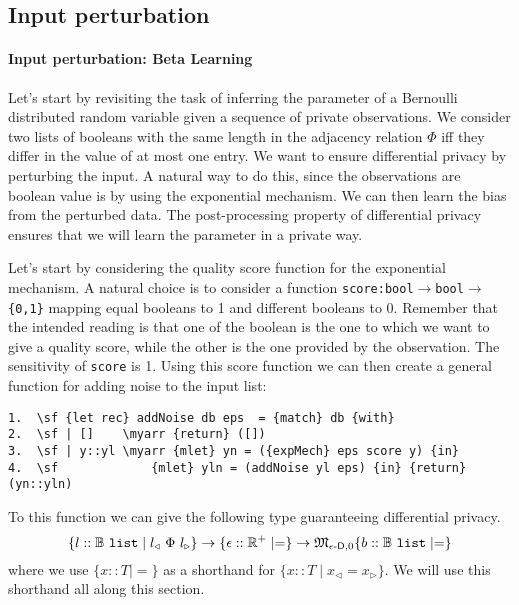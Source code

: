 \documentclass{sig-alternate-05-2015}
\theoremstyle{plain}
\theoremstyle{definition}
\theoremstyle{corollary}
\def\kwlist{\mathtt{list}}
\newcommand{\stbool}[0]{\mathbb{B}}
\newcommand{\stlist}[1]{{#1}\ \kwlist}
\def\lvmark{\triangleleft}
\def\rvmark{\triangleright}
\renewcommand{\l}[1]{#1_\lvmark}
\renewcommand{\r}[1]{#1_\rvmark}
\def\R{\mathbb{R}}
\newcommand{\rplus}{\R^+}
\begin{document}
\subsection{Input perturbation}
\paragraph{Input perturbation: Beta Learning}
Let's start by revisiting the task of inferring the parameter of a
Bernoulli distributed random variable given a sequence of private
observations. 
We consider two lists of booleans with the same length 
in the adjacency relation $\Phi$ iff they differ in the value of at
most one entry. 
We want to ensure differential privacy by perturbing the input. A
natural way to do this, since the observations are boolean value is by
using the exponential mechanism. We can  then learn the bias from the perturbed data. The post-processing property of differential privacy
ensures that we will learn the parameter in a private way.

Let's start by considering the quality score function for the exponential mechanism. A natural choice is to consider a function  \texttt{score:bool}$\rightarrow$\texttt{bool}$\rightarrow$\texttt{\{0,1\}} mapping equal booleans to 1 and different booleans to 0. Remember that the intended reading is that one of the boolean is the one to which we want to give a quality score, while the other is the one provided by the observation.  The sensitivity of \texttt{score} is 1.
Using this score function we can then create a general function for adding noise to the input list:
\begin{Verbatim}[commandchars=\\\{\}]
1.  \sf {let rec} addNoise db eps  = {match} db {with}
2.  \sf | []    \myarr {return} ([])
3.  \sf | y::yl \myarr {mlet} yn = ({expMech} eps score y) {in}
4.  \sf             {mlet} yln = (addNoise yl eps) {in} {return}(yn::yln)
\end{Verbatim}
To this function we can give the following type guaranteeing differential privacy.
$$
\{l:: \stlist{\stbool} \mid \l{l}\ \Phi\ \r{l}\}\rightarrow
\{\epsilon::\rplus \mid =\}\rightarrow
\mathfrak{M}_{\epsilon\textnormal{-}\mathsf{D},0}\{b::\stlist{\stbool} \mid = \}
$$
where we use $\{x::T \mid = \}$ as a shorthand for  $\{x::T \mid  \l{x}=\r{x} \}$. We will use this shorthand all along this section.
\end{document}
